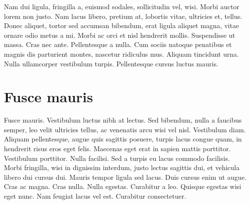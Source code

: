 Nam dui ligula, fringilla a, euismod sodales, sollicitudin vel,
wisi. Morbi auctor lorem non justo. Nam lacus libero, pretium at,
lobortis vitae, ultricies et, tellus. Donec aliquet, tortor sed
accumsan bibendum, erat ligula aliquet magna, vitae ornare odio metus
a mi. Morbi ac orci et nisl hendrerit mollis. Suspendisse ut
massa. Cras nec ante. Pellentesque a nulla.  Cum sociis natoque
penatibus et magnis dis parturient montes, nascetur ridiculus
mus. Aliquam tincidunt urna. Nulla ullamcorper vestibulum
turpis. Pellentesque cursus luctus mauris.

\section{Fusce mauris}

Fusce mauris. Vestibulum luctus nibh at lectus. Sed bibendum, nulla a
faucibus semper, leo velit ultricies tellus, ac venenatis arcu wisi
vel nisl.  Vestibulum diam. Aliquam pellentesque, augue quis sagittis
posuere, turpis lacus congue quam, in hendrerit risus eros eget
felis. Maecenas eget erat in sapien mattis porttitor. Vestibulum
porttitor. Nulla facilisi.  Sed a turpis eu lacus commodo
facilisis. Morbi fringilla, wisi in dignissim interdum, justo lectus
sagittis dui, et vehicula libero dui cursus dui. Mauris tempor ligula
sed lacus. Duis cursus enim ut augue. Cras ac magna.  Cras
nulla. Nulla egestas. Curabitur a leo. Quisque egestas wisi eget
nunc. Nam feugiat lacus vel est. Curabitur consectetuer.



